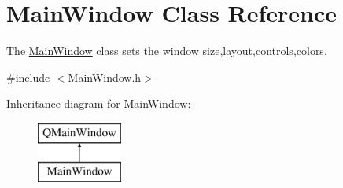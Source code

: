 \hypertarget{class_main_window}{}\section{Main\+Window Class Reference}
\label{class_main_window}


The \hyperlink{class_main_window}{Main\+Window} class sets the window size,layout,controls,colors.  




{\ttfamily \#include $<$Main\+Window.\+h$>$}

Inheritance diagram for Main\+Window\+:\begin{figure}[H]
\begin{center}
\leavevmode
\includegraphics[height=2.000000cm]{class_main_window}
\end{center}
\end{figure}
